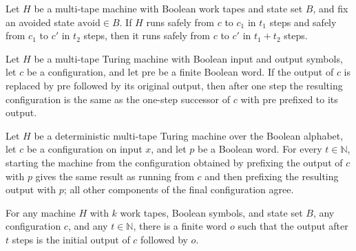 \begin{theorem}
\label{Turing.SafeRun.trans}
\leanok
{}
Let $H$ be a multi-tape machine with Boolean work tapes and state set $B$, and fix an
avoided state $\mathrm{avoid}\in B$. If $H$ runs safely from $c$ to $c_1$ in $t_1$ steps
and safely from $c_1$ to $c'$ in $t_2$ steps, then it runs safely from $c$ to $c'$ in
$t_1+t_2$ steps.
\end{theorem}

\begin{theorem}
\label{Turing.step_output_prefix}
\leanok
{}
Let $H$ be a multi-tape Turing machine with Boolean input and output symbols, let $c$ be
a configuration, and let $\mathrm{pre}$ be a finite Boolean word. If the output of $c$
is replaced by $\mathrm{pre}$ followed by its original output, then after one step the
resulting configuration is the same as the one-step successor of $c$ with $\mathrm{pre}$
prefixed to its output.
\end{theorem}

\begin{theorem}
\label{Turing.runFrom_output_prefix}
\leanok
{}
Let $H$ be a deterministic multi-tape Turing machine over the Boolean alphabet, let $c$
be a configuration on input $x$, and let $p$ be a Boolean word. For every $t\in\mathbb
N$, starting the machine from the configuration obtained by prefixing the output of $c$
with $p$ gives the same result as running from $c$ and then prefixing the resulting
output with $p$; all other components of the final configuration agree.
\end{theorem}

\begin{theorem}
\label{Turing.runFrom_output_extends}
\leanok
{}
For any machine $H$ with $k$ work tapes, Boolean symbols, and state set $B$, any
configuration $c$, and any $t\in\mathbb N$, there is a finite word $o$ such that the
output after $t$ steps is the initial output of $c$ followed by $o$.
\end{theorem}

